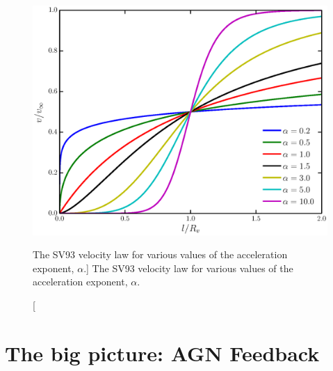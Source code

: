 \begin{figure}
\centering
\includegraphics[width=1.0\textwidth]{figures/05-cvpaper/acc_law.eps}
\caption
[The SV93 velocity law for various values of the
acceleration exponent, $\alpha$.]
{
The SV93 velocity law for various values of the
acceleration exponent, $\alpha$.
} 
\label{acc_law}
\end{figure}




\section{The big picture: AGN Feedback}
\label{sec:agn_feedback}

